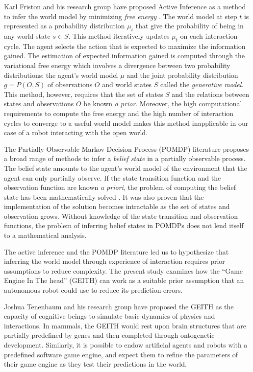 \documentclass[runningheads]{llncs}
\begin{document}
Karl Friston and his research group have proposed Active Inference \cite[e.g.]{smith_step-by-step_2022} as a method to infer the world model by minimizing \textit{free energy} \cite{friston_free-energy_2010}.
The world model at step $t$ is represented as a probability distribution $\mu_t$ that give the probability of being in any world state $s \in S$. 
This method iteratively updates $\mu_t$ on each interaction cycle.
The agent selects the action that is expected to maximize the information gained. 
The estimation of expected information gained is computed through the variational free energy which involves a divergence between two probability distributions: the agent's world model $\mu$ and the joint probability distribution $g = P(O, S)$ of observations $O$ and world states $S$ called the \textit{generative model}. 
This method, however, requires that the set of states $S$ and the relations between states and observations $O$ be known \textit{a prior}. 
Moreover, the high computational requirements to compute the free energy and the high number of interaction cycles to converge to a useful world model makes this method inapplicable in our case of a robot interacting with the open world. 

The Partially Observable Markov Decision Process (POMDP) literature proposes a broad range of methods to infer a \textit{belief state} in a partially observable process.
The belief state amounts to the agent's world model of the environment that the agent can only partially observe.  
If the state transition function and the observation function are known \textit{a priori}, the problem of computing the belief state has been mathematically solved \cite{astrom1965optimal}. 
It was also proven that the implementation of the solution becomes intractable as the set of states and observation grows. 
Without knowledge of the state transition and observation functions, the problem of inferring belief states in POMDPs does not lend itself to a mathematical analysis. 

The active inference and the POMDP literature led us to hypothesize that inferring the world model through experience of interaction requires prior assumptions to reduce complexity. 
The present study examines how the ``Game Engine In The head'' (GEITH) can work as a suitable prior assumption that an autonomous robot could use to reduce its prediction errors. 

Joshua Tenenbaum and his research group have proposed the GEITH \cite{battaglia_simulation_2013} as the capacity of cognitive beings to simulate basic dynamics of physics and interactions. 
In mammals, the GEITH would rest upon brain structures that are partially predefined by genes and then completed through ontogenetic development.  
Similarly, it is possible to endow artificial agents and robots with a predefined software game engine, and expect them to refine the parameters of their game engine as they test their predictions in the world.
\end{document}
